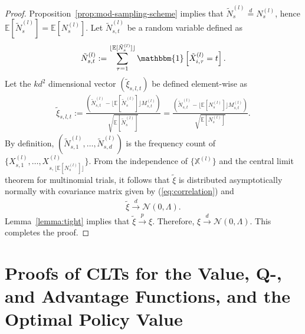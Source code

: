 \documentclass[twoside,11pt]{article}
\newcommand{\pow}[1]{^{(#1)}}%
\numberwithin{equation}{section}
\newcommand{\lp}{\left(}
\newcommand{\rp}{\right)}
\newcommand{\Ncal}{\mathcal{N}}
\newcommand{\expec}{\mathbb{E}}
\begin{document}
\begin{proof}
Proposition~\ref{prop:mod-sampling-scheme} implies that $\tilde{N}_{s}\pow{l} \overset{d}{=} N_{s}\pow{l}$, hence $\expec[\tilde N_s\pow l]=\expec[N_s\pow l]$. 
Let $\tilde N_{s, t}\pow l$ be a random variable defined as 
\begin{equation}
\tilde N_{s, t}\pow l:=\sum_{\tau=1}^{\lfloor \expec[\tilde N_s\pow l] \rfloor} \mathbbm{1}\left[\tilde X_{i, \tau} \pow l=t \right].  
\end{equation}
Let the $kd^2$ dimensional vector $(\tilde \xi_{s,l,t})$ be defined element-wise as
\begin{align*}
\tilde \xi_{s,l,t}:= \frac{\lp\tilde N_{s,t}\pow l - \lfloor \expec[\tilde N_s\pow l]\rfloor M_{s,t}\pow l \rp}{\sqrt{\expec[\tilde N_s\pow l]}} = \frac{\lp\tilde N_{s,t}\pow l - \lfloor \expec[N_s\pow l]\rfloor M_{s,t}\pow l \rp}{\sqrt{\expec[N_s\pow l]}}.
\end{align*}
By definition, $\lp \tilde N_{s,1} \pow l, \ldots,   \tilde N_{s,d} \pow l\rp$ is the frequency count of $\{X_{s,1} \pow l, \ldots, X_{s,\lfloor \expec[N_s \pow l] \rfloor}\pow l\}$.
From the independence of $\{\mathbb X \pow l\}$ and the central limit theorem for multinomial trials, it follows that $\tilde \xi$ is distributed asymptotically normally with covariance matrix given by (\ref{eq:correlation}) and
    \begin{align*}
    \tilde \xi \overset{d}{\rightarrow} \Ncal(0,\Lambda).
    \end{align*}
Lemma~\ref{lemma:tight} implies that $\tilde \xi \xrightarrow{\ p \ } \xi$. Therefore, $\xi \overset{d}{\rightarrow} \Ncal(0,\Lambda)$. This completes the proof.

\end{proof}

\section{Proofs of CLTs for the Value, Q-, and Advantage Functions, and the Optimal Policy Value}
\end{document}
